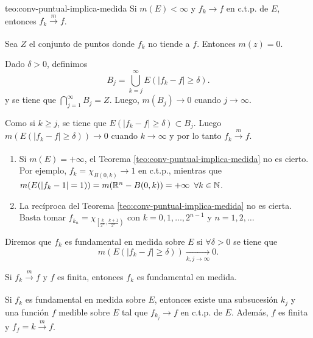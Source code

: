 \begin{teorema}{teo:conv-puntual-implica-medida}
Si $m(E)<\infty$ y $f_k \to f$ en c.t.p. de $E$, entonces 
$f_k \xrightarrow[]{m}f$.
\end{teorema}


\begin{demo}
Sea $Z$ el conjunto de puntos donde $f_k$ no tiende a $f$. Entonces $m(z)=0$. 

Dado $\delta>0$, definimos 
\[
B_j=\bigcup\limits_{k=j}^{\infty} E(|f_k-f|\geq \delta).
\]
 y se tiene que $ \bigcap\limits_{j=1}^{\infty} B_j=Z.$
 Luego, $m(B_j)\to 0$ cuando $j \to \infty$.
 
 Como si $k \geq j$, se tiene que $E(|f_k-f|\geq \delta )\subset B_j$.
Luego $m(E(|f_k-f|\geq \delta))\to 0$ cuando $k \to \infty$
y por lo tanto $f_k \xrightarrow[]{m}f.$
\end{demo}

\begin{observacion}{}
\begin{enumerate}
    \item Si $m(E)=+\infty$, el Teorema \ref{teo:conv-puntual-implica-medida} no es cierto. 
    Por ejemplo,  $f_k=\chi_{B(0,k)} \to 1$ en c.t.p., mientras que 
    $m(E(|f_k-1|=1 ))=m(\mathbb{R}^n-B(0,k))= +\infty$\; $\forall k\in \mathbb{N}$.
    \item La rec\'iproca del Teorema \ref{teo:conv-puntual-implica-medida} no es cierta. 
    Basta tomar $f_{k_n}=\chi_{\left[\frac{k}{2^n}, \frac{k+1}{2^n}\right)}$ con 
    $k=0,1, \ldots, 2^{n-1}$ y $n=1,2,\ldots$
\end{enumerate}
\end{observacion}{}

\begin{definicion}{}
Diremos que $f_k$ es fundamental en medida sobre $E$ si $\forall \delta>0$ se tiene que 
\[
m(E(|f_k-f|\geq \delta))\xrightarrow[k,j \to \infty]{} 0.
\]
\end{definicion}

\begin{observacion}{}
Si $f_k \xrightarrow[]{m}f$ y $f$ es finita, entonces $f_k$ es fundamental en medida. 
\end{observacion}



\begin{teorema}{}
Si $f_k$ es fundamental en medida sobre $E$, entonces existe una subsucesi\'on $k_j$ y una funci\'on $f$ medible sobre $E$ tal que $f_{k_j}\to f$ en c.t.p. de $E$. Adem\'as, $f$ es finita y $f_f=k \xrightarrow[]{m}f$.
\end{teorema}

